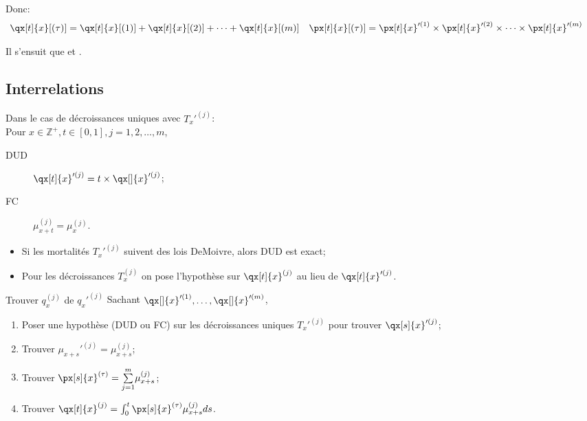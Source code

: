 \documentclass[10pt, french]{article}
\begin{document}
\begin{multicols*}{2}
Donc:
\begin{align*}
	\qx[t]{x}[(\tau)]
	&=	\qx[t]{x}[(1)]	+	\qx[t]{x}[(2)]	+	\dots	+	\qx[t]{x}[(m	)]	&
	\px[t]{x}[(\tau)]
	&=	\px[t]{x}'^{(1)}	\times	\px[t]{x}'^{(2)}	\times	\dots	\times	\px[t]{x}'^{(m)}
\end{align*}

Il s'ensuit que  et .

\columnbreak
\subsection*{Interrelations}
\begin{rappel_enhanced}[Hypothèses]
Dans le cas de décroissances uniques avec $T_{x}'^{(j)}$:\\

Pour $x \in \mathbb{Z}^{+}, t \in [0, 1], j = 1, 2, \dots, m$,
\begin{description}
	\item[DUD]	$\qx[t]{x}'^{(j)} = t \times \qx[]{x}'^{(j)}$;
	\item[FC]	$\mu_{x + t}^{(j)} = \mu_{x}^{(j)}$.
\end{description}

\begin{itemize}[leftmargin = *]
	\item	Si les mortalités $T_{x}'^{(j)}$ suivent des lois DeMoivre, alors DUD est exact;
	\item	Pour les décroissances $T_{x}^{(j)}$ on pose l'hypothèse sur $\qx[t]{x}^{(j)}$ au lieu de $\qx[t]{x}'^{(j)}$.
\end{itemize}
\end{rappel_enhanced}

\begin{conceptgen}{Trouver $q_{x}^{(j)}$ de $q_{x}'^{(j)}$}
Sachant $\qx[]{x}'^{(1)}, \dots, \qx[]{x}'^{(m)}$,
\begin{enumerate}
	\item	Poser une hypothèse (DUD ou FC) sur les décroissances uniques $T_{x}'^{(j)}$ pour trouver $\qx[s]{x}'^{(j)}$;
	\item	Trouver $\mu_{x + s}'^{(j)}	=	\mu_{x + s}^{(j)}$;
	\item	Trouver $\px[s]{x}^{(\tau)}	=	\sumz{m}{j = 1}\mu_{x + s}^{(j)}$;
	\item	Trouver $\qx[t]{x}^{(j)}	=	\int_{0}^{t}\px[s]{x}^{(\tau)}\mu_{x + s}^{(j)}ds$.
\end{enumerate}


\end{conceptgen}
\end{multicols*}
\end{document}
